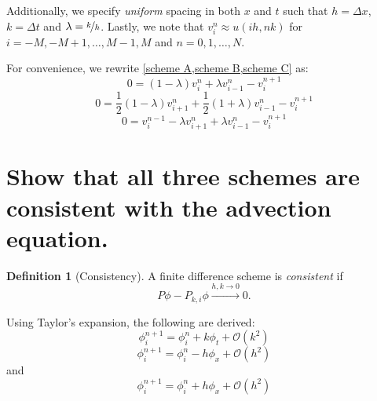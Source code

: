 \documentclass{math_hw}
\theoremstyle{definition}
\newtheorem{definition}{Definition}[section]
\begin{document}
    Additionally, we specify \textit{uniform} spacing in both $x$ and $t$ such that $h=\Delta x$, $k=\Delta t$ and $\lambda = \nicefrac{k}{h}$.
    Lastly, we note that $v_i^n\approx u(ih,nk)$ for $i=-M,-M+1,\ldots,M-1,M$ and $n=0,1,\ldots,N$.

    For convenience, we rewrite \cref{scheme A,scheme B,scheme C} as:
    \begin{equation}
        \label{scheme A'}
        \tag{A'}
        0=(1-\lambda)v_i^n+\lambda v_{i-1}^n-v^{n+1}_i
    \end{equation}
    \begin{equation}
        \label{scheme B'}
        \tag{B'}
        0=\frac{1}{2}(1-\lambda)v_{i+1}^n + \frac{1}{2}(1+\lambda)v_{i-1}^n-v^{n+1}_i
    \end{equation}
    \begin{equation}
        \label{scheme C'}
        \tag{C'}
        0=v_i^{n-1}-\lambda v_{i+1}^n +\lambda v_{i-1}^n-v^{n+1}_i
    \end{equation}


    \section{Show that all three schemes are consistent with the advection equation.}
    \begin{definition}[Consistency]\label{eq:consistency}
        A finite difference scheme is \textit{consistent} if
        \begin{equation}
            P\phi -P_{k,i}\phi \xrightarrow{h,k\to 0} 0.
        \end{equation}
    \end{definition}

    Using Taylor's expansion, the following are derived:
    \begin{equation}
        \phi_i^{n+1} = \phi_i^n +k\phi_t + \mathcal{O}(k^2)
    \end{equation}
    \begin{equation}
        \phi_i^{n+1} = \phi_i^n -h\phi_x + \mathcal{O}(h^2)
    \end{equation}
    and
    \begin{equation}
        \phi_i^{n+1} = \phi_i^n+h\phi_x+\mathcal{O}(h^2)
    \end{equation}
\end{document}

